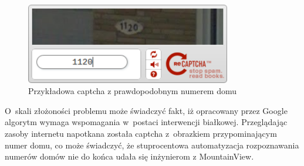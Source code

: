 \begin{figure}[h!]
    \centering
    \includegraphics[width=0.8\textwidth]{img/rev_captcha_street_view}
    \caption{Przykładowa captcha z prawdopodobnym numerem domu}
\end{figure}

O~skali złożoności problemu może świadczyć fakt, iż
opracowany przez Google algorytm wymaga wspomagania w~postaci interwencji
białkowej. Przeglądając zasoby internetu napotkana została captcha
z~obrazkiem przypominającym numer domu, co może świadczyć, że stuprocentowa
automatyzacja rozpoznawania numerów domów nie do końca udała się inżynierom
z MountainView.

